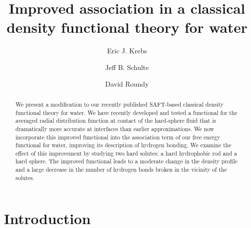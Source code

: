 \documentclass[twocolumn,amsmath,amssymb]{revtex4-1}
\begin{document}
\title{Improved association in a classical density functional theory
  for water}

\author{Eric J. Krebs}
\author{Jeff B. Schulte}
\author{David Roundy}

\begin{abstract}
We present a modification to our recently published SAFT-based classical
density functional theory for water.
%
We have recently developed and tested a functional for the averaged
radial distribution function at contact of the hard-sphere fluid
that is dramatically more accurate at interfaces than earlier
approximations.
%
We now incorporate this improved functional into the association term
of our free energy functional for water, improving its description of
hydrogen bonding.
%
We examine the effect of this improvement by studying two hard solutes: a
hard hydrophobic rod and a hard sphere.
%
The improved functional leads to a moderate change in the density
profile and a large decrease in the number of hydrogen bonds broken in
the vicinity of the solutes.
\end{abstract}
\maketitle

\section{Introduction}
\end{document}
